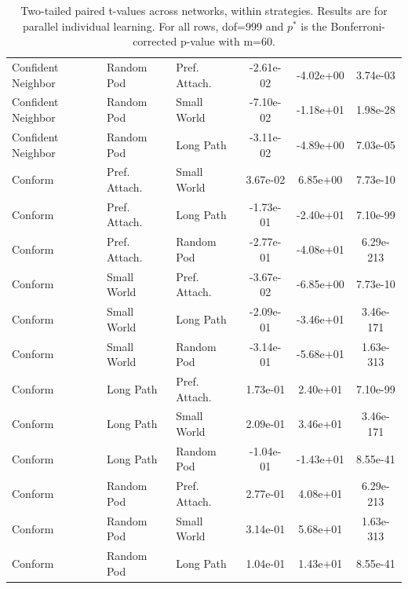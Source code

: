 \documentclass[twocolumn,10pt]{article}
\begin{document}
\begin{table}[]
\begin{tabular}{l|ll|ccc}
Confident Neighbor&Random Pod&Pref. Attach.&-2.61e-02&-4.02e+00&3.74e-03\\
Confident Neighbor&Random Pod&Small World&-7.10e-02&-1.18e+01&1.98e-28\\
Confident Neighbor&Random Pod&Long Path&-3.11e-02&-4.89e+00&7.03e-05\\
\hline
Conform&Pref. Attach.&Small World&3.67e-02&6.85e+00&7.73e-10\\
Conform&Pref. Attach.&Long Path&-1.73e-01&-2.40e+01&7.10e-99\\
Conform&Pref. Attach.&Random Pod&-2.77e-01&-4.08e+01&6.29e-213\\
Conform&Small World&Pref. Attach.&-3.67e-02&-6.85e+00&7.73e-10\\
Conform&Small World&Long Path&-2.09e-01&-3.46e+01&3.46e-171\\
Conform&Small World&Random Pod&-3.14e-01&-5.68e+01&1.63e-313\\
Conform&Long Path&Pref. Attach.&1.73e-01&2.40e+01&7.10e-99\\
Conform&Long Path&Small World&2.09e-01&3.46e+01&3.46e-171\\
Conform&Long Path&Random Pod&-1.04e-01&-1.43e+01&8.55e-41\\
Conform&Random Pod&Pref. Attach.&2.77e-01&4.08e+01&6.29e-213\\
Conform&Random Pod&Small World&3.14e-01&5.68e+01&1.63e-313\\
Conform&Random Pod&Long Path&1.04e-01&1.43e+01&8.55e-41\\
    \hline
    \end{tabular}
    \caption{Two-tailed paired t-values across networks, within strategies. Results are for parallel individual learning. For all rows, dof=999 and $p^*$ is the Bonferroni-corrected p-value with m=60.}
    \label{tab:my_label}
\end{table}
\end{document}
